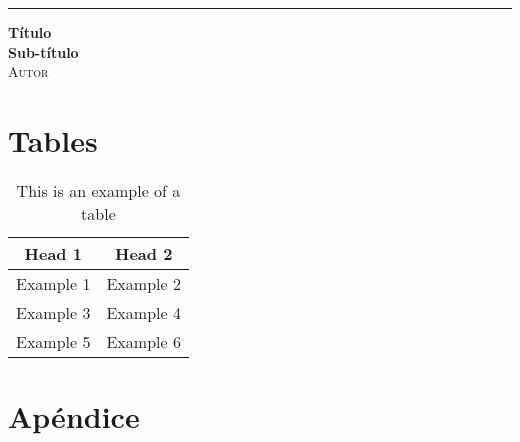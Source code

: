 \documentclass[12pt]{article}
\begin{document}
	\begin{titlepage}
		\raggedleft %
	
		\rule{1pt}{\textheight} %
		\hspace{0.05\textwidth} %
		\parbox[b]{0.75\textwidth}{ %
		
		{\Huge\bfseries Título\\[0.5\baselineskip] Sub-título}\\[2\baselineskip] %
		{\Large\textsc{Autor}} %
		
		\vspace{0.5\textheight} %
		}
	\end{titlepage}
	\newpage
	\tableofcontents
	\newpage
	\section{Tables}
	\begin{table}[H]
		\centering
		\begin{tabular}{|c|c|}
		  \rowcolor{gray!50}
		  \hline
			Head 1 & Head 2 \\
			\hline
			Example 1 & Example 2 \\
			Example 3 & Example 4 \\
			Example 5 & Example 6 \\
			\hline
		\end{tabular}
		\label{tab: 01}
		\caption{This is an example of a table}
	\end{table}
	\section{Apéndice}
	\listoffigures
	\listoftables
\end{document}
